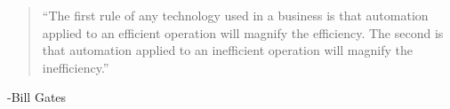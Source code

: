 \newpage
\hspace{5cm}

\begin{quotation}
    “The first rule of any technology used in a business is that automation applied to an efficient operation will magnify the efficiency. The second is that automation applied to an inefficient operation will magnify the inefficiency.”
\end{quotation}
-Bill Gates
